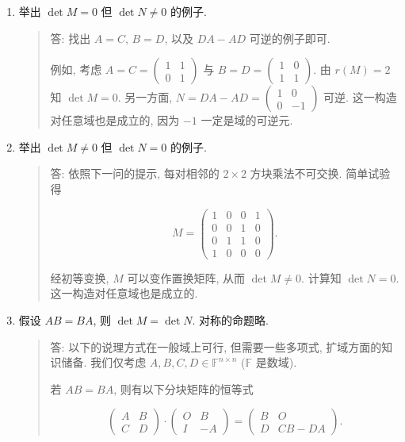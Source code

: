 \documentclass[
]{ctexart}
\begin{document}
\begin{enumerate}
\def\labelenumi{\arabic{enumi}.}
\item
  举出 \(\det M=0\) 但 \(\det N\neq 0\) 的例子.

  \begin{quote}
  答: 找出 \(A=C\), \(B=D\), 以及 \(DA-AD\) 可逆的例子即可.

  例如, 考虑 \(A=C=\begin{pmatrix}1&1\\0&1\end{pmatrix}\) 与
  \(B=D=\begin{pmatrix}1&0\\1&1\end{pmatrix}\). 由 \(r(M)=2\) 知
  \(\det M=0\). 另一方面,
  \(N=DA-AD=\begin{pmatrix}1&0\\0&-1\end{pmatrix}\) 可逆.
  这一构造对任意域也是成立的, 因为 \(-1\) 一定是域的可逆元.
  \end{quote}
\item
  举出 \(\det M\neq 0\) 但 \(\det N=0\) 的例子.

  \begin{quote}
  答: 依照下一问的提示, 每对相邻的 \(2\times 2\) 方块乘法不可交换.
  简单试验得

  \[M=\begin{pmatrix}1&0&0&1\\0&0&1&0\\0&1&1&0\\1&0&0&0\end{pmatrix}.\]

  经初等变换, \(M\) 可以变作置换矩阵, 从而 \(\det M\neq 0\). 计算知
  \(\det N=0\). 这一构造对任意域也是成立的.
  \end{quote}
\item
  假设 \(AB=BA\), 则 \(\det M = \det N\). 对称的命题略.

  \begin{quote}
  答: 以下的说理方式在一般域上可行, 但需要一些多项式,
  扩域方面的知识储备. 我们仅考虑 \(A,B,C,D\in \mathbb F^{n\times n}\)
  (\(\mathbb F\) 是数域).

  若 \(AB=BA\), 则有以下分块矩阵的恒等式

  \[\begin{pmatrix}A&B\\C&D\end{pmatrix}\cdot \begin{pmatrix}O&B\\I&-A\end{pmatrix}=\begin{pmatrix}B&O\\D&CB-DA\end{pmatrix}.\]


\end{quote}
\end{enumerate}
\end{document}
